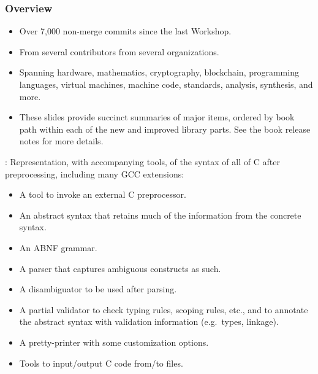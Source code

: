 

\begin{frame}

\frametitle{Overview}

\begin{itemize}
\item Over 7,000 non-merge commits since the last Workshop.
\item From several contributors from several organizations.
\item Spanning hardware, mathematics, cryptography, blockchain,
      programming languages, virtual machines, machine code,
      standards, analysis, synthesis, and more.
\item These slides provide succinct summaries of major items,
      ordered by book path within each of the new and improved library parts.
      See the book release notes for more details.
\end{itemize}

\end{frame}


\begin{frame}

\newlibtitle

:
Representation, with accompanying tools,
of the syntax of all of C after preprocessing,
including many GCC extensions:
\begin{itemize}
\item A tool to invoke an external C preprocessor.
\item An abstract syntax that retains
      much of the information from the concrete syntax.
\item An ABNF grammar.
\item A parser that captures ambiguous constructs as such.
\item A disambiguator to be used after parsing.
\item A partial validator to check typing rules, scoping rules, etc.,
      and to annotate the abstract syntax with validation information
      (e.g.\ types, linkage).
\item A pretty-printer with some customization options.
\item Tools to input/output C code from/to files.
\end{itemize}

\end{frame}

